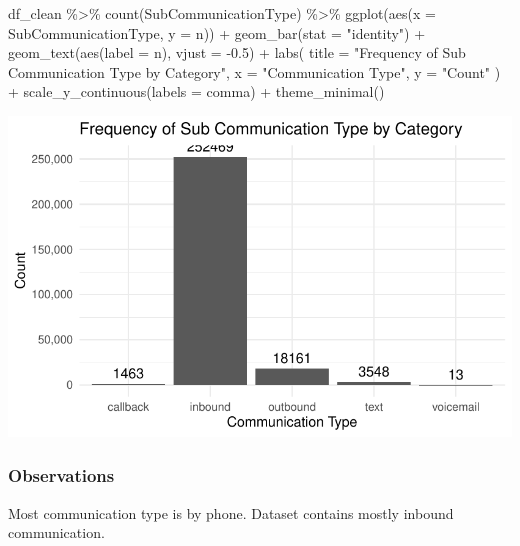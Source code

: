 \documentclass[
  letterpaper,
  DIV=11,
  numbers=noendperiod]{scrartcl}
\newenvironment{Shaded}{\begin{snugshade}}{\end{snugshade}}
\newcommand{\AttributeTok}[1]{\textcolor[rgb]{0.40,0.45,0.13}{#1}}
\newcommand{\FloatTok}[1]{\textcolor[rgb]{0.68,0.00,0.00}{#1}}
\newcommand{\FunctionTok}[1]{\textcolor[rgb]{0.28,0.35,0.67}{#1}}
\newcommand{\NormalTok}[1]{\textcolor[rgb]{0.00,0.23,0.31}{#1}}
\newcommand{\SpecialCharTok}[1]{\textcolor[rgb]{0.37,0.37,0.37}{#1}}
\newcommand{\StringTok}[1]{\textcolor[rgb]{0.13,0.47,0.30}{#1}}
\begin{document}
\begin{Shaded}
\begin{Highlighting}[]
\NormalTok{df\_clean }\SpecialCharTok{\%\textgreater{}\%}
  \FunctionTok{count}\NormalTok{(SubCommunicationType) }\SpecialCharTok{\%\textgreater{}\%}
  \FunctionTok{ggplot}\NormalTok{(}\FunctionTok{aes}\NormalTok{(}\AttributeTok{x =}\NormalTok{ SubCommunicationType, }\AttributeTok{y =}\NormalTok{ n)) }\SpecialCharTok{+}
  \FunctionTok{geom\_bar}\NormalTok{(}\AttributeTok{stat =} \StringTok{"identity"}\NormalTok{) }\SpecialCharTok{+} 
  \FunctionTok{geom\_text}\NormalTok{(}\FunctionTok{aes}\NormalTok{(}\AttributeTok{label =}\NormalTok{ n), }\AttributeTok{vjust =} \SpecialCharTok{{-}}\FloatTok{0.5}\NormalTok{) }\SpecialCharTok{+}
  \FunctionTok{labs}\NormalTok{(}
    \AttributeTok{title =} \StringTok{"Frequency of Sub Communication Type by Category"}\NormalTok{,}
    \AttributeTok{x =} \StringTok{"Communication Type"}\NormalTok{, }
    \AttributeTok{y =} \StringTok{"Count"}
\NormalTok{  ) }\SpecialCharTok{+}
  \FunctionTok{scale\_y\_continuous}\NormalTok{(}\AttributeTok{labels =}\NormalTok{ comma) }\SpecialCharTok{+}
  \FunctionTok{theme\_minimal}\NormalTok{()}
\end{Highlighting}
\end{Shaded}

\includegraphics{final_proj_group1_files/figure-pdf/com_type-2.pdf}

\subsubsection{Observations}\label{observations}

Most communication type is by phone. Dataset contains mostly inbound
communication.
\end{document}
